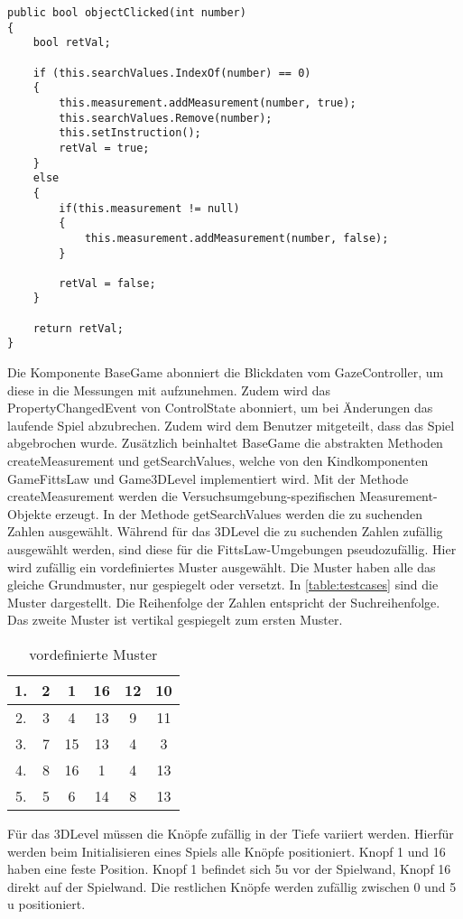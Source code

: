 \begin{lstlisting}[caption=Methode objectClicked,label=lstlisting:objectClicked,float=!htbp]
public bool objectClicked(int number)
{
	bool retVal;
	
	if (this.searchValues.IndexOf(number) == 0)
	{
		this.measurement.addMeasurement(number, true);
		this.searchValues.Remove(number);
		this.setInstruction();
		retVal = true;
	}
	else
	{
		if(this.measurement != null)
		{
			this.measurement.addMeasurement(number, false);
		}
	
		retVal = false;
	}
	
	return retVal;
}
\end{lstlisting}

Die Komponente BaseGame abonniert die Blickdaten vom {\ttfamily GazeController}, um diese in die Messungen mit aufzunehmen. Zudem wird das {\ttfamily PropertyChangedEvent} von ControlState abonniert, um bei Änderungen das laufende Spiel abzubrechen. Zudem wird dem Benutzer mitgeteilt, dass das Spiel abgebrochen wurde. Zusätzlich beinhaltet {\ttfamily BaseGame} die abstrakten Methoden {\ttfamily createMeasurement} und {\ttfamily getSearchValues}, welche von den Kindkomponenten {\ttfamily GameFittsLaw} und {\ttfamily Game3DLevel} implementiert wird. Mit der Methode {\ttfamily createMeasurement} werden die Versuchsumgebung-spezifischen Measurement-Objekte erzeugt. In der Methode {\ttfamily getSearchValues} werden die zu suchenden Zahlen ausgewählt. Während für das 3DLevel die zu suchenden Zahlen zufällig ausgewählt werden, sind diese für die FittsLaw-Umgebungen pseudozufällig. Hier wird zufällig ein vordefiniertes Muster ausgewählt. Die Muster haben alle das gleiche Grundmuster, nur gespiegelt oder versetzt. In \autoref{table:testcases} sind die Muster dargestellt. Die Reihenfolge der Zahlen entspricht der Suchreihenfolge. Das zweite Muster ist vertikal gespiegelt zum ersten Muster. 

\begin{table}[!htbp]
	\centering
	\caption{vordefinierte Muster}
	\label{table:testcases}
	\begin{tabular}{|c ||c c c c c|} 
		\hline
		1. & 2 & 1 & 16 & 12 & 10 \\ 
		\hline
		2. & 3 & 4 & 13 & 9 & 11 \\
		\hline
		3. & 7 & 15 & 13 & 4 & 3 \\
		\hline
		4. & 8 & 16 & 1 & 4 & 13 \\
		\hline
		5. & 5 & 6 & 14 & 8 & 13 \\
		\hline
	\end{tabular}
\end{table}

Für das 3DLevel müssen die Knöpfe zufällig in der Tiefe variiert werden. Hierfür werden beim Initialisieren eines Spiels alle Knöpfe positioniert. Knopf 1 und 16 haben eine feste Position. Knopf 1 befindet sich 5\ac{u} vor der Spielwand, Knopf 16 direkt auf der Spielwand. Die restlichen Knöpfe werden zufällig zwischen 0 und 5 \ac{u} positioniert.